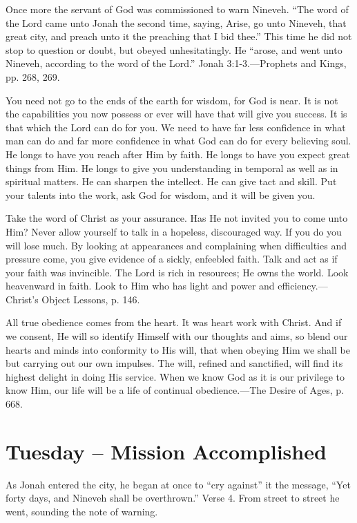 \documentclass[a4paper, 10pt, twoside, headings=small]{scrartcl}
\begin{document}
\begin{multicols}{2}
Once more the servant of God was commissioned to warn Nineveh. “The word of the Lord came unto Jonah the second time, saying, Arise, go unto Nineveh, that great city, and preach unto it the preaching that I bid thee.” This time he did not stop to question or doubt, but obeyed unhesitatingly. He “arose, and went unto Nineveh, according to the word of the Lord.” Jonah 3:1-3.—Prophets and Kings, pp. 268, 269.

You need not go to the ends of the earth for wisdom, for God is near. It is not the capabilities you now possess or ever will have that will give you success. It is that which the Lord can do for you. We need to have far less confidence in what man can do and far more confidence in what God can do for every believing soul. He longs to have you reach after Him by faith. He longs to have you expect great things from Him. He longs to give you understanding in temporal as well as in spiritual matters. He can sharpen the intellect. He can give tact and skill. Put your talents into the work, ask God for wisdom, and it will be given you.

Take the word of Christ as your assurance. Has He not invited you to come unto Him? Never allow yourself to talk in a hopeless, discouraged way. If you do you will lose much. By looking at appearances and complaining when difficulties and pressure come, you give evidence of a sickly, enfeebled faith. Talk and act as if your faith was invincible. The Lord is rich in resources; He owns the world. Look heavenward in faith. Look to Him who has light and power and efficiency.—Christ’s Object Lessons, p. 146.

All true obedience comes from the heart. It was heart work with Christ. And if we consent, He will so identify Himself with our thoughts and aims, so blend our hearts and minds into conformity to His will, that when obeying Him we shall be but carrying out our own impulses. The will, refined and sanctified, will find its highest delight in doing His service. When we know God as it is our privilege to know Him, our life will be a life of continual obedience.—The Desire of Ages, p. 668.

\section*{Tuesday – Mission Accomplished}

As Jonah entered the city, he began at once to “cry against” it the message, “Yet forty days, and Nineveh shall be overthrown.” Verse 4. From street to street he went, sounding the note of warning.


\end{multicols}
\end{document}
